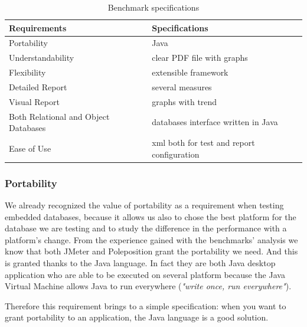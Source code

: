 \begin{table}[htp!]
	\centering
	\begin{tabular}{| p{6cm} | p{6cm} |} \hline
	
	\bfseries{Requirements} & \bfseries{Specifications} \\ \hline \hline
	
	Portability & Java \\ 
	\hline
	
	Understandability & clear PDF file with graphs \\
	\hline
	
	Flexibility & extensible framework  \\
	\hline
	
	Detailed Report & several measures \\
	\hline
	
	Visual Report & graphs with trend \\
	\hline
		
	Both Relational and Object Databases & databases interface written in Java \\
	\hline
	
	Ease of Use & xml both for test and report configuration\\
	\hline		
	
	\end{tabular}
	\caption{Benchmark specifications}
	\label{benchmark-specifications-table}
\end{table}

			\subsubsection{Portability}
We already recognized the value of portability as a requirement when testing embedded databases, because it allows us also to chose the best platform for the database we are testing and to study the difference in the performance with a platform's change. From the experience gained with the benchmarks' analysis we know that both JMeter and Poleposition grant the portability we need. And this is granted thanks to the Java language. In fact they are both Java desktop application who are able to be executed on several platform because the Java Virtual Machine allows Java to run everywhere (\emph{"write once, run everywhere"}).

Therefore this requirement brings to a simple specification: when you want to grant portability to an application, the Java language is a good solution. 
		
